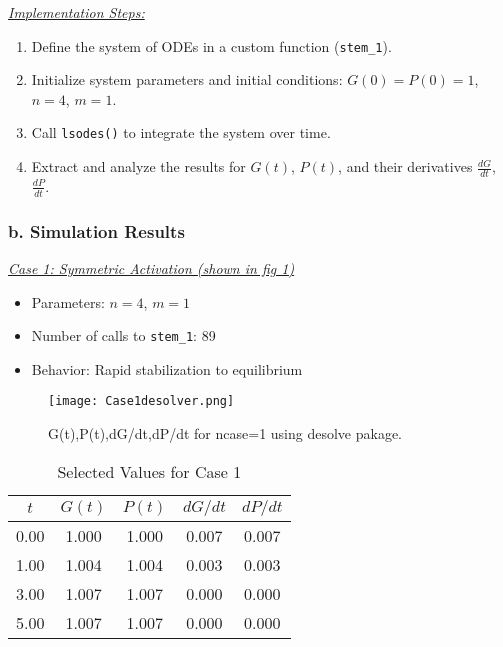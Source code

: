 \documentclass[journal]{IEEEtran}
\begin{document}
\underline{\textit{Implementation Steps:}}
\begin{enumerate}
    \item Define the system of ODEs in a custom function (\texttt{stem\_1}).
    \item Initialize system parameters and initial conditions: \( G(0) = P(0) = 1 \), \( n = 4 \), \( m = 1 \).
    \item Call \texttt{lsodes()} to integrate the system over time.
    \item Extract and analyze the results for \( G(t) \), \( P(t) \), and their derivatives \( \frac{dG}{dt} \), \( \frac{dP}{dt} \).
\end{enumerate}

\vspace{1em}

\subsubsection*{\textbf{b. Simulation Results}} \hfill

\underline{\textit{Case 1: Symmetric Activation (shown in fig 1)}}
\begin{itemize}
    \item Parameters: \( n = 4 \), \( m = 1 \)
    \item Number of calls to \texttt{stem\_1}: 89
    \item Behavior: Rapid stabilization to equilibrium
\end{itemize}

\begin{figure}[H]%
\begin {center}
\texttt{[image: Case1desolver.png]}
\caption{ G(t),P(t),dG/dt,dP/dt for  ncase=1 using desolve pakage. }
\label{fig:ecg}
\end {center}
\end{figure}
\begin{table}[H]
\centering
\caption{Selected Values for Case 1}
\begin{tabular}{@{}ccccc@{}}
\toprule
$t$ & $G(t)$ & $P(t)$ & $dG/dt$ & $dP/dt$ \\
\midrule
0.00 & 1.000 & 1.000 & 0.007 & 0.007 \\
1.00 & 1.004 & 1.004 & 0.003 & 0.003 \\
3.00 & 1.007 & 1.007 & 0.000 & 0.000 \\
5.00 & 1.007 & 1.007 & 0.000 & 0.000 \\
\bottomrule
\end{tabular}
\end{table}
\end{document}
